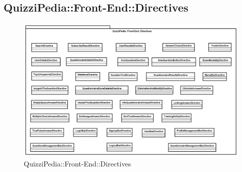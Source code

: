 \newpage

\subsection{QuizziPedia::Front-End::Directives}

\label{QuizziPedia::Front-End::Directives}
\begin{figure} [ht]
	\centering
	\includegraphics[scale=0.40]{UML/Package/QuizziPedia_Front-End_Directives.png}
	\caption{QuizziPedia::Front-End::Directives}
\end{figure}

